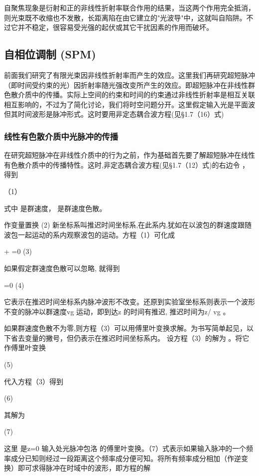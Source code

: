 自聚焦现象是衍射和正的非线性折射率联合作用的结果，当这两个作用完全抵消，则光束既不收缩也不发散，长距离陷在由它建立的"光波导"中，这就叫自陷阱。不过它并不稳定，很容易受光强的起伏或其它干扰因素的作用而破坏。

\subsection{自相位调制 (SPM)}
前面我们研究了有限光束因非线性折射率而产生的效应。这里我们再研究超短脉冲（即时间受约束的光）因折射率随光强改变所产生的效应。即超短脉冲在非线性群色散介质中的传播。实际上空间的约束和时间的约束通过非线性折射率是相互关联相互影响的，不过为了简化讨论，我们将时空问题分开。这里假定输入光是平面波但其时间波形是脉冲形式。这时要用非定态耦合波方程(见§1.7（16）式) 

\subsubsection{线性有色散介质中光脉冲的传播}
在研究超短脉冲在非线性介质中的行为之前，作为基础首先要了解超短脉冲在线性有色散介质中的传播特性。这时,非定态耦合波方程(见§1.7（12）式)的右边令 ，得到

                （1）

式中  是群速度， 是群速度色散。

作变量置换
                                       (2)              
新坐标系叫推迟时间坐标系,在此系内,犹如在以波包的群速度跟随波包一起运动的系内观察波包的运动。方程（1）可化成 

       + =0                              (3)

如果假定群速度色散可以忽略, 就得到

        =0                                      (4)

它表示在推迟时间坐标系内脉冲波形不改变。还原到实验室坐标系则表示一个波形不变的脉冲以群速度vg 运动，即到达z 的时间有推迟, 推迟时间为z/ vg 。

如果群速度色散不为零,则方程（3）可以用傅里叶变换求解。为书写简单起见，以下省去变量的撇号，但仍表示在推迟时间坐标系内。 设方程（3）的解为 。将它作傅里叶变换

                                        (5)

代入方程（3）得到

                                       (6)

其解为   

                                     (7)

这里 是z=0 输入处光脉冲包洛 的傅里叶变换。（7）式表示如果输入脉冲的一个频率成分已知则经过一段距离这个频率成分便可知。将所有频率成分相加（作逆变换）即可求得脉冲在时域中的波形，即方程的解


